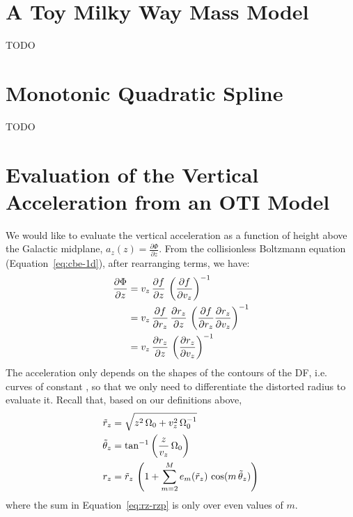 \appendix

\section{A Toy Milky Way Mass Model}
\label{sec:appendix-potential}

TODO


\section{Monotonic Quadratic Spline}
\label{sec:appendix-spline}

TODO

\section{Evaluation of the Vertical Acceleration from an OTI Model}
\label{sec:appendix-az}

We would like to evaluate the vertical acceleration as a function of height above the
Galactic midplane, $a_z(z) = \frac{\partial \Phi}{\partial z}$.
From the collisionless Boltzmann equation (Equation~\ref{eq:cbe-1d}), after rearranging
terms, we have:
\begin{align}
    \frac{\partial \Phi}{\partial z} &=
        v_z \, \frac{\partial f}{\partial z} \,
        \left( \frac{\partial f}{\partial v_z} \right)^{-1} \\
    &= v_z \, \frac{\partial f}{\partial r_z} \, \frac{\partial r_z}{\partial z} \,
        \left( \frac{\partial f}{\partial r_z} \frac{\partial r_z}{\partial v_z} \right)^{-1} \\
        &= v_z \, \frac{\partial r_z}{\partial z} \,
        \left( \frac{\partial r_z}{\partial v_z} \right)^{-1}
\end{align}
The acceleration only depends on the shapes of the contours of the DF, i.e. curves of
constant \rz, so that we only need to differentiate the distorted radius to evaluate it.
Recall that, based on our definitions above,
\begin{align}
    \tilde{r}_z &= \sqrt{z^2 \, \Omega_0 + v_z^2 \, \Omega_0^{-1}} \\
    \tilde{\theta}_z &= \tan^{-1}\left(\frac{z}{v_z} \, \Omega_0\right) \\
    r_z &= \tilde{r}_z \, \left( 1 + \sum_{m=2}^{M} e_m(\tilde{r}_z) \,
        \cos(m \, \tilde{\theta}_z) \right) \label{eq:rz-rzp}
\end{align}
where the sum in Equation~\ref{eq:rz-rzp} is only over even values of $m$.

